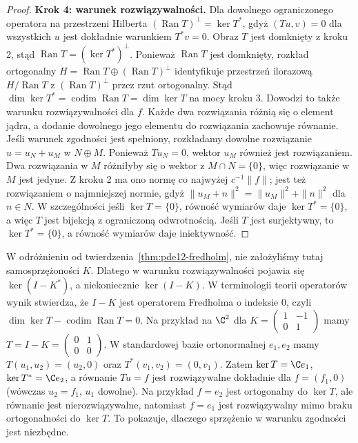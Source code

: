 \begin{proof}
\textbf{Krok 4: warunek rozwiązywalności.}
Dla dowolnego ograniczonego operatora na przestrzeni Hilberta
$(\operatorname{Ran}T)^\perp=\ker T^*$,
gdyż $(Tu,v)=0$ dla wszystkich $u$ jest dokładnie
warunkiem $T^*v=0$. Obraz $T$ jest domknięty
z kroku 2, stąd
$\operatorname{Ran}T=(\ker T^*)^\perp$.
Ponieważ $\operatorname{Ran}T$ jest domknięty,
rozkład ortogonalny
$H=\operatorname{Ran}T\oplus(\operatorname{Ran}T)^\perp$
identyfikuje przestrzeń ilorazową
$H/\operatorname{Ran}T$ z $(\operatorname{Ran}T)^\perp$
przez rzut ortogonalny.
Stąd $\dim\ker T^*=\operatorname{codim}\operatorname{Ran}T
=\dim\ker T$ na mocy kroku 3. Dowodzi to także
warunku rozwiązywalności dla $f$.
Każde dwa rozwiązania różnią się o element jądra,
a dodanie dowolnego jego elementu do rozwiązania zachowuje
równanie. Jeśli warunek zgodności jest spełniony, rozkładamy
dowolne rozwiązanie $u=u_N+u_M$ w $N\oplus M$.
Ponieważ $Tu_N=0$, wektor $u_M$ również jest rozwiązaniem.
Dwa rozwiązania w $M$ różniłyby się o wektor
z $M\cap N=\{0\}$, więc rozwiązanie w $M$ jest jedyne.
Z kroku 2 ma ono normę co najwyżej $c^{-1}\|f\|$;
jest też rozwiązaniem o najmniejszej normie,
gdyż $\|u_M+n\|^2=\|u_M\|^2+\|n\|^2$ dla $n\in N$.
W szczególności jeśli $\ker T=\{0\}$, równość wymiarów
daje $\ker T^*=\{0\}$, a więc $T$ jest bijekcją
z ograniczoną odwrotnością. Jeśli $T$ jest surjektywny,
to $\ker T^*=\{0\}$, a równość wymiarów daje iniektywność.
\end{proof}

\begin{uwaga}
W odróżnieniu od twierdzenia~\ref{thm:pde12-fredholm},
nie założyliśmy tutaj samosprzężoności $K$.
Dlatego w warunku rozwiązywalności pojawia się
$\ker(I-K^*)$, a niekoniecznie $\ker(I-K)$.
W terminologii teorii operatorów wynik stwierdza,
że $I-K$ jest operatorem Fredholma o indeksie $0$,
czyli $\dim\ker T-\operatorname{codim}\operatorname{Ran}T=0$.
Na przykład na $\C^2$ dla
$K=\begin{pmatrix}1&-1\\0&1\end{pmatrix}$
mamy $T=I-K=\begin{pmatrix}0&1\\0&0\end{pmatrix}$.
W standardowej bazie ortonormalnej $e_1,e_2$ mamy
$T(u_1,u_2)=(u_2,0)$ oraz $T^*(v_1,v_2)=(0,v_1)$.
Zatem $\ker T=\C e_1$, $\ker T^*=\C e_2$,
a równanie $Tu=f$ jest rozwiązywalne dokładnie dla
$f=(f_1,0)$ (wówczas $u_2=f_1$, $u_1$ dowolne).
Na przykład $f=e_2$ jest ortogonalny do $\ker T$,
ale równanie jest nierozwiązywalne, natomiast $f=e_1$
jest rozwiązywalny mimo braku ortogonalności do $\ker T$.
To pokazuje, dlaczego sprzężenie w warunku zgodności
jest niezbędne.
\end{uwaga}

